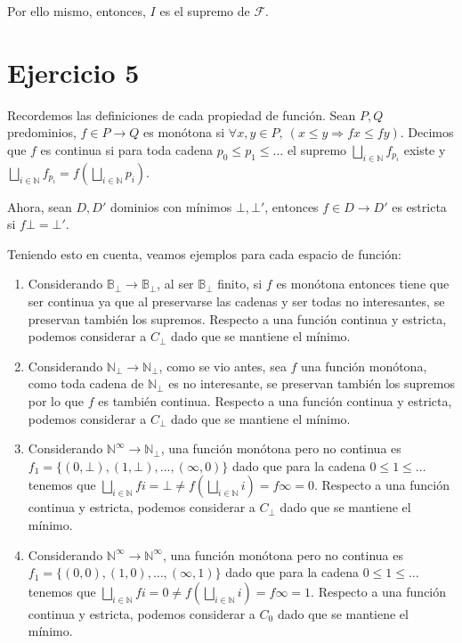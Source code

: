 \documentclass{article}
\newcommand{\N}{\mathbb{N}}
\newcommand{\B}{\mathbb{B}}
\begin{document}
Por ello mismo, entonces, $I$ es el supremo de $\mathcal{F}$.

\section*{Ejercicio 5}
Recordemos las definiciones de cada propiedad de función.
Sean $P, Q$ predominios, $f \in P \to Q$ es monótona si $\forall x, y \in P,\ (x \leq y \Rightarrow fx \leq fy)$.
Decimos que $f$ es continua si para toda cadena $p_0 \leq p_1 \leq \dots$ el supremo $\bigsqcup\limits_{i \in \N} f_{p_i}$ existe y $\bigsqcup\limits_{i \in \N} f_{p_i} = f\left(\bigsqcup\limits_{i \in \N} p_i\right)$.

Ahora, sean $D, D'$ dominios con mínimos $\bot, \bot'$, entonces $f \in D \to D'$ es estricta si $f \bot = \bot'$.

Teniendo esto en cuenta, veamos ejemplos para cada espacio de función:
\begin{enumerate}[label=(\alph*)]
	\item Considerando $\B_\bot \to \B_\bot$, al ser $\B_\bot$ finito, si $f$ es monótona entonces tiene que ser continua ya que al preservarse las cadenas y ser todas no interesantes, se preservan también los supremos.
	      Respecto a una función continua y estricta, podemos considerar a $C_\bot$ dado que se mantiene el mínimo.

	\item Considerando $\N_\bot \to \N_\bot$, como se vio antes, sea $f$ una función monótona, como toda cadena de $\N_\bot$ es no interesante, se preservan también los supremos por lo que $f$ es también continua.
	      Respecto a una función continua y estricta, podemos considerar a $C_\bot$ dado que se mantiene el mínimo.

	\item Considerando $\N^\infty \to \N_\bot$, una función monótona pero no continua es $f_1 = \{(0, \bot), (1, \bot), \dots, (\infty, 0)\}$ dado que para la cadena $0 \leq 1 \leq \dots$ tenemos que $\bigsqcup\limits_{i \in \N} fi = \bot \neq f\left(\bigsqcup\limits_{i \in \N} i\right) = f \infty = 0$.
	      Respecto a una función continua y estricta, podemos considerar a $C_\bot$ dado que se mantiene el mínimo.

	\item Considerando $\N^\infty \to \N^\infty$, una función monótona pero no continua es $f_1 = \{(0, 0), (1, 0), \dots, (\infty, 1)\}$ dado que para la cadena $0 \leq 1 \leq \dots$ tenemos que $\bigsqcup\limits_{i \in \N} fi = 0 \neq f\left(\bigsqcup\limits_{i \in \N} i\right) = f \infty = 1$.
	      Respecto a una función continua y estricta, podemos considerar a $C_0$ dado que se mantiene el mínimo.
\end{enumerate}
\end{document}
